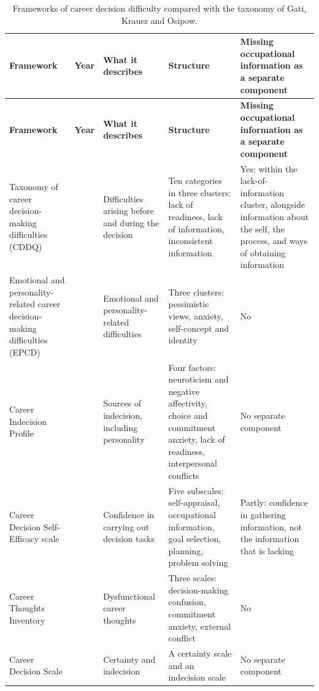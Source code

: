 {\small
\begin{longtable}{|>{\raggedright\arraybackslash}p{}|>{\raggedright\arraybackslash}p{}|>{\raggedright\arraybackslash}p{}|>{\raggedright\arraybackslash}p{}|>{\raggedright\arraybackslash}p{}|}
\caption{Frameworks of career decision difficulty compared with the taxonomy of Gati, Krausz and Osipow.} \\
\hline
\textbf{Framework} & \textbf{Year} & \textbf{What it describes} & \textbf{Structure} & \textbf{Missing occupational information as a separate component} \\ \hline
\endfirsthead
\hline
\textbf{Framework} & \textbf{Year} & \textbf{What it describes} & \textbf{Structure} & \textbf{Missing occupational information as a separate component} \\ \hline
\endhead
Taxonomy of career decision-making difficulties (CDDQ)\cite{r1} & 1996 & Difficulties arising before and during the decision & Ten categories in three clusters: lack of readiness, lack of information, inconsistent information & Yes: within the lack-of-information cluster, alongside information about the self, the process, and ways of obtaining information \\ \hline
Emotional and personality-related career decision-making difficulties (EPCD)\cite{r106} & 2008 & Emotional and personality-related difficulties & Three clusters: pessimistic views, anxiety, self-concept and identity & No \\ \hline
Career Indecision Profile\cite{r107} & 2013 & Sources of indecision, including personality & Four factors: neuroticism and negative affectivity, choice and commitment anxiety, lack of readiness, interpersonal conflicts & No separate component \\ \hline
Career Decision Self-Efficacy scale\cite{r108} & 1983 & Confidence in carrying out decision tasks & Five subscales: self-appraisal, occupational information, goal selection, planning, problem solving & Partly: confidence in gathering information, not the information that is lacking \\ \hline
Career Thoughts Inventory\cite{r109} & 1996 & Dysfunctional career thoughts & Three scales: decision-making confusion, commitment anxiety, external conflict & No \\ \hline
Career Decision Scale\cite{r110} & 1976 & Certainty and indecision & A certainty scale and an indecision scale & No separate component \\ \hline
\end{longtable}
}

